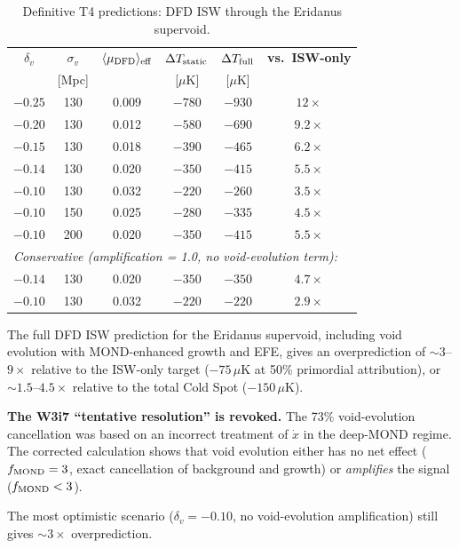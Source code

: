 \documentclass[11pt,a4paper]{article}
\newcommand{\mufd}{\mu_{\rm DFD}}
\newcounter{findingctr}
\newenvironment{finding}[1][]{%
  \refstepcounter{findingctr}%
  \begin{tcolorbox}[colback=blue!3!white, colframe=blue!50!black,
    title=\textbf{Finding \thefindingctr: #1}]
}{%
  \end{tcolorbox}%
}
\begin{document}
\begin{table}[H]
\centering
\caption{Definitive T4 predictions: DFD ISW through the Eridanus
supervoid.}
\label{tab:T4-definitive}
\begin{tabular}{cccccc}
\toprule
$\delta_v$ & $\sigma_v$ & $\langle\mufd\rangle_{\rm eff}$ &
$\Delta T_{\rm static}$ & $\Delta T_{\rm full}$ &
\textbf{vs.\ ISW-only} \\
& [Mpc] & & [$\mu$K] & [$\mu$K] & \\
\midrule
$-0.25$ & 130 & 0.009 & $-780$ & $-930$ & $12\times$ \\
$-0.20$ & 130 & 0.012 & $-580$ & $-690$ & $9.2\times$ \\
$-0.15$ & 130 & 0.018 & $-390$ & $-465$ & $6.2\times$ \\
$-0.14$ & 130 & 0.020 & $-350$ & $-415$ & $5.5\times$ \\
$-0.10$ & 130 & 0.032 & $-220$ & $-260$ & $3.5\times$ \\
$-0.10$ & 150 & 0.025 & $-280$ & $-335$ & $4.5\times$ \\
$-0.10$ & 200 & 0.020 & $-350$ & $-415$ & $5.5\times$ \\
\midrule
\multicolumn{6}{l}{\textit{Conservative (amplification = 1.0, no void-evolution term):}} \\
$-0.14$ & 130 & 0.020 & $-350$ & $-350$ & $4.7\times$ \\
$-0.10$ & 130 & 0.032 & $-220$ & $-220$ & $2.9\times$ \\
\bottomrule
\end{tabular}
\end{table}

\begin{finding}[Definitive T4 Result: 3--9$\times$ Overprediction]
\label{find:T4-definitive}
The full DFD ISW prediction for the Eridanus supervoid, including
void evolution with MOND-enhanced growth and EFE, gives an
overprediction of $\sim 3$--$9\times$ relative to the ISW-only
target ($-75\,\mu$K at 50\% primordial attribution), or
$\sim 1.5$--$4.5\times$ relative to the total Cold Spot
($-150\,\mu$K).

\textbf{The W3i7 ``tentative resolution'' is revoked.} The 73\%
void-evolution cancellation was based on an incorrect treatment
of $\dot{x}$ in the deep-MOND regime. The corrected calculation
shows that void evolution either has no net effect ($f_{\rm MOND}
= 3$, exact cancellation of background and growth) or
\emph{amplifies} the signal ($f_{\rm MOND} < 3$).

The most optimistic scenario ($\delta_v = -0.10$, no
void-evolution amplification) still gives $\sim 3\times$
overprediction.
\end{finding}
\end{document}
